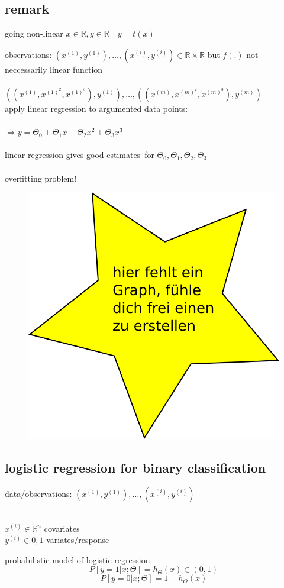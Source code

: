 \subsection*{remark} going non-linear $x \in \mathbb{R}, y \in \mathbb{R} \quad y=t(x)$
\begin{addmargin}[2 cm]{0 cm}
observations: $(x^{(1)}, y^{(1)}), \dots ,(x^{(i)}, y^{(i)}) \in \mathbb{R} \times \mathbb{R}$ but $f(.)$ not neccessarily linear function\\\\
$((x^{(1)},x^{(1)^2}, x^{(1)^3}), y^{(1)}), \dots , ((x^{(m)},x^{(m)^2}, x^{(m)^3}), y^{(m)})$\\
apply linear regression to argumented data points:\\\\
$\Rightarrow y = \Theta_0 + \Theta_1  x + \Theta_2  x^2 + \Theta_3 x^3$\\\\
linear regression gives \glqq good estimates\grqq\ for $\Theta_0, \Theta_1, \Theta_2, \Theta_3$\\\\
overfitting problem!

	\begin{figure}
		\centering
		\includegraphics[width=0.7\linewidth]{graphs/dummy}
	\end{figure}
	
\end{addmargin}

\subsection*{logistic regression for binary classification}
data/observations: $(x^{(1)}, y^{(1)}), \dots , (x^{(i)}, y^{(i)})$\\\\
\begin{center}
 $x^{(i)} \in \mathbb{R}^n$ \space covariates\\
 $y^{(i)} \in {0,1}$ \space variates/response
\end{center}
probabilistic model of logistic regression
\[P[y=1|x;\Theta] = h_{\Theta}(x) \in (0,1)\]
\[P[y=0|x;\Theta] = 1-h_{\Theta}(x) \]

